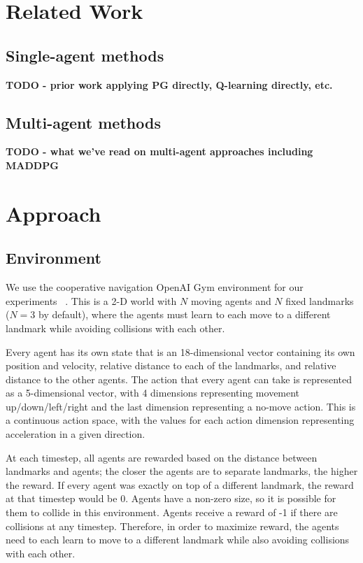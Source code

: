 \documentclass{article}
\begin{document}
\section{Related Work}
\subsection{Single-agent methods}
\textbf{TODO - prior work applying PG directly, Q-learning directly, etc.}

\subsection{Multi-agent methods}
\textbf{TODO - what we've read on multi-agent approaches including MADDPG}

\section{Approach}

\subsection{Environment}

We use the cooperative navigation OpenAI Gym environment for our experiments ~\cite{openaigym}. This is a 2-D world with $N$ moving agents and $N$ fixed landmarks ($N=3$ by default), where the agents must learn to each move to a different landmark while avoiding collisions with each other.

Every agent has its own state that is an 18-dimensional vector containing its own position and velocity, relative distance to each of the landmarks, and relative distance to the other agents. The action that every agent can take is represented as a 5-dimensional vector, with 4 dimensions representing movement up/down/left/right and the last dimension representing a no-move action. This is a continuous action space, with the values for each action dimension representing acceleration in a given direction.

At each timestep, all agents are rewarded based on the distance between landmarks and agents; the closer the agents are to separate landmarks, the higher the reward. If every agent was exactly on top of a different landmark, the reward at that timestep would be 0. Agents have a non-zero size, so it is possible for them to collide in this environment. Agents receive a reward of -1 if there are collisions at any timestep. Therefore, in order to maximize reward, the agents need to each learn to move to a different landmark while also avoiding collisions with each other.
\end{document}
